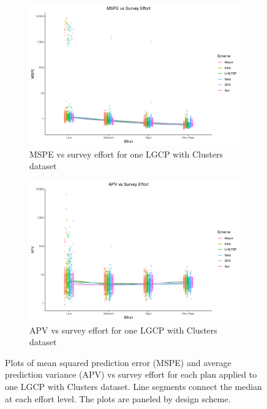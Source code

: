 \documentclass[review]{elsarticle}
\begin{document}
\begin{figure}

\begin{subfigure}{5in}
\includegraphics[width=5in]{../graphics/MSPE-effort-notpaneled-Cluster000004.png}
\caption{MSPE vs survey effort for one LGCP with Clusters dataset}
\label{mspeclust}
\end{subfigure}

\begin{subfigure}{5in}
\includegraphics[width=5in]{../graphics/APV-effort-notpaneled-Cluster000004.png}
\caption{APV vs survey effort for one LGCP with Clusters dataset}
\label{apvclust}
\end{subfigure}

\caption{Plots of mean squared prediction error (MSPE) and average prediction
variance (APV) vs survey effort for each plan applied to one LGCP with Clusters
dataset. Line segments connect the median at each effort level. The plots are
paneled by design scheme.}
\label{clustresults}
\end{figure}
\end{document}
